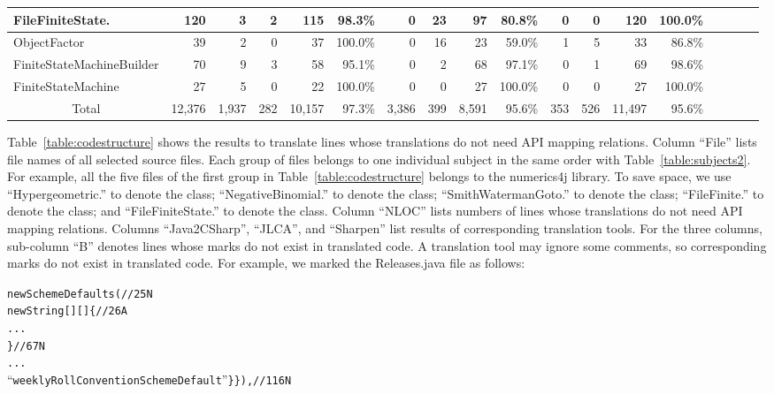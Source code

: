 \begin{table*}[t]
\begin{SmallOut}
\begin {tabular} {|l|r|r|r|r|r|r|r|r|r|r|r|r|r|r|r|r|r|}
\hline
FileFiniteState.& 120  & 3  & 2  & 115 & 98.3\% & 0   & 23 & 97  & 80.8\% & 0  & 0 & 120  & 100.0\%\\
\hline
  ObjectFactor                 & 39   & 2  & 0  & 37  & 100.0\%& 0   & 16 & 23  & 59.0\% & 1  & 5 & 33   & 86.8\%\\
\hline
  FiniteStateMachineBuilder    & 70   & 9  & 3  & 58  & 95.1\% & 0   & 2  & 68  & 97.1\% & 0  & 1 & 69   & 98.6\%\\
\hline
  FiniteStateMachine           & 27    & 5  & 0 & 22 & 100.0\%& 0   & 0  & 27  & 100.0\%& 0  & 0 & 27   & 100.0\%\\
\hline\hline
\multicolumn{1}{|c|}{Total}     &12,376&1,937& 282&10,157& 97.3\% & 3,386& 399&8,591 & 95.6\% & 353&526&11,497 & 95.6\%\\
\hline
\end{tabular}%
 \label{table:codestructure}
\end{SmallOut}%
\end{table*}

Table~\ref{table:codestructure} shows the results to translate lines whose translations do not need API mapping relations. Column ``File'' lists file names of all selected source files. Each group of files belongs to one individual subject in the same order with Table~\ref{table:subjects2}. For example, all the five files of the first group in Table~\ref{table:codestructure} belongs to the numerics4j library. To save space, we use ``Hypergeometric.'' to denote the  class; ``NegativeBinomial.'' to denote the  class; ``SmithWatermanGoto.'' to denote the  class; ``FileFinite.'' to denote the  class; and ``FileFiniteState.'' to denote the  class. Column ``NLOC'' lists numbers of lines whose translations do not need API mapping relations. Columns ``Java2CSharp'', ``JLCA'', and ``Sharpen'' list results of corresponding translation tools. For the three columns, sub-column ``B'' denotes lines whose marks do not exist in translated code. A translation tool may ignore some comments, so corresponding marks do not exist in translated code. For example, we marked the Releases.java file as follows:

\begin{CodeOut}%
\begin{alltt}
new SchemeDefaults (//25N
  new String [][] \{//26A
  ...
  \}//67N
  ...
``weeklyRollConventionSchemeDefault'' \} \}),//116N
\end{alltt}
\end{CodeOut}

